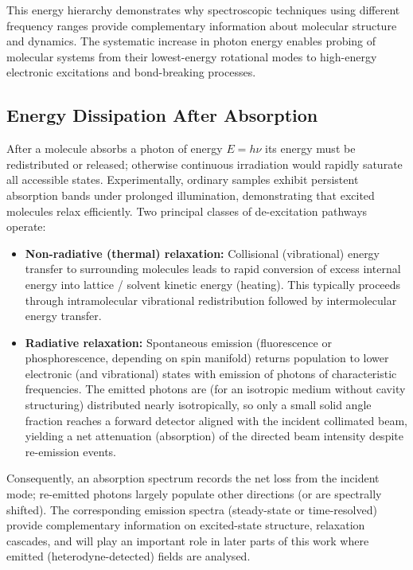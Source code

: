 \noindent This energy hierarchy demonstrates why spectroscopic techniques using different frequency ranges provide complementary information about molecular structure and dynamics. The systematic increase in photon energy enables probing of molecular systems from their lowest-energy rotational modes to high-energy electronic excitations and bond-breaking processes.


\subsection{Energy Dissipation After Absorption}
\label{subsec:energy_dissipation}

\noindent After a molecule absorbs a photon of energy $E = h\nu$ its energy must be redistributed or released; otherwise continuous irradiation would rapidly saturate all accessible states. Experimentally, ordinary samples exhibit persistent absorption bands under prolonged illumination, demonstrating that excited molecules relax efficiently. Two principal classes of de-excitation pathways operate:
\begin{itemize}
	\item \textbf{Non-radiative (thermal) relaxation:} Collisional (vibrational) energy transfer to surrounding molecules leads to rapid conversion of excess internal energy into lattice / solvent kinetic energy (heating). This typically proceeds through intramolecular vibrational redistribution followed by intermolecular energy transfer.
	\item \textbf{Radiative relaxation:} Spontaneous emission (fluorescence or phosphorescence, depending on spin manifold) returns population to lower electronic (and vibrational) states with emission of photons of characteristic frequencies. The emitted photons are (for an isotropic medium without cavity structuring) distributed nearly isotropically, so only a small solid angle fraction reaches a forward detector aligned with the incident collimated beam, yielding a net attenuation (absorption) of the directed beam intensity despite re-emission events.
\end{itemize}

\noindent Consequently, an absorption spectrum records the net loss from the incident mode; re-emitted photons largely populate other directions (or are spectrally shifted). The corresponding emission spectra (steady-state or time-resolved) provide complementary information on excited-state structure, relaxation cascades, and will play an important role in later parts of this work where emitted (heterodyne-detected) fields are analysed.


